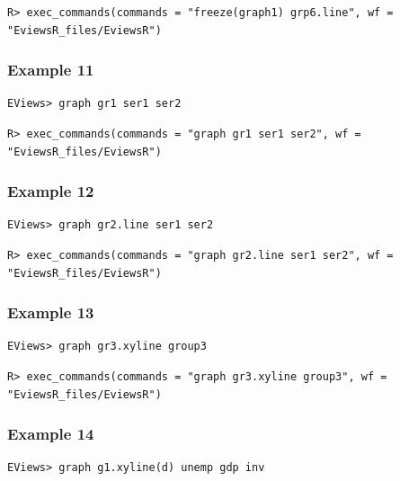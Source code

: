 \begin{verbatim}
R> exec_commands(commands = "freeze(graph1) grp6.line", wf = "EviewsR_files/EviewsR")
\end{verbatim}

\hypertarget{example-11}{%
\subsubsection{Example 11}\label{example-11}}

\begin{verbatim}
EViews> graph gr1 ser1 ser2
\end{verbatim}

\begin{verbatim}
R> exec_commands(commands = "graph gr1 ser1 ser2", wf = "EviewsR_files/EviewsR")
\end{verbatim}

\hypertarget{example-12}{%
\subsubsection{Example 12}\label{example-12}}

\begin{verbatim}
EViews> graph gr2.line ser1 ser2
\end{verbatim}

\begin{verbatim}
R> exec_commands(commands = "graph gr2.line ser1 ser2", wf = "EviewsR_files/EviewsR")
\end{verbatim}

\hypertarget{example-13}{%
\subsubsection{Example 13}\label{example-13}}

\begin{verbatim}
EViews> graph gr3.xyline group3
\end{verbatim}

\begin{verbatim}
R> exec_commands(commands = "graph gr3.xyline group3", wf = "EviewsR_files/EviewsR")
\end{verbatim}

\hypertarget{example-14}{%
\subsubsection{Example 14}\label{example-14}}

\begin{verbatim}
EViews> graph g1.xyline(d) unemp gdp inv
\end{verbatim}

